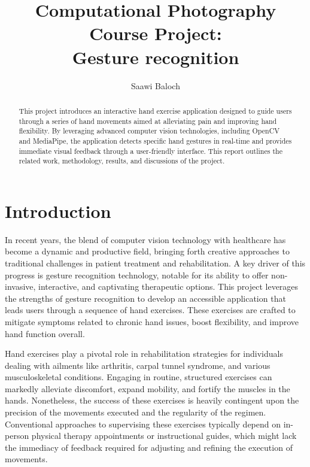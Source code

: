 \documentclass[12pt, letterpaper, twoside]{article}
\title{\textbf{Computational Photography Course Project:\\Gesture recognition}} %
\author{Saawi Baloch} %
\affiliation{Ontario Tech University} %
\begin{document}
\maketitle

\begin{abstract}
    \noindent
    
    This project introduces an interactive hand exercise application designed to guide users through a series of hand movements aimed at alleviating pain and improving hand flexibility. By leveraging advanced computer vision technologies, including OpenCV and MediaPipe, the application detects specific hand gestures in real-time and provides immediate visual feedback through a user-friendly interface. This report outlines the related work, methodology, results, and discussions of the project.

\end{abstract}

\vspace{2.5cm}

\thispagestyle{firstpage}

\pagebreak


\newgeometry{} %

\section{Introduction}
\label{sec:intro}
    In recent years, the blend of computer vision technology with healthcare has become a dynamic and productive field, bringing forth creative approaches to traditional challenges in patient treatment and rehabilitation. A key driver of this progress is gesture recognition technology, notable for its ability to offer non-invasive, interactive, and captivating therapeutic options. This project leverages the strengths of gesture recognition to develop an accessible application that leads users through a sequence of hand exercises. These exercises are crafted to mitigate symptoms related to chronic hand issues, boost flexibility, and improve hand function overall.

    Hand exercises play a pivotal role in rehabilitation strategies for individuals dealing with ailments like arthritis, carpal tunnel syndrome, and various musculoskeletal conditions. Engaging in routine, structured exercises can markedly alleviate discomfort, expand mobility, and fortify the muscles in the hands. Nonetheless, the success of these exercises is heavily contingent upon the precision of the movements executed and the regularity of the regimen. Conventional approaches to supervising these exercises typically depend on in-person physical therapy appointments or instructional guides, which might lack the immediacy of feedback required for adjusting and refining the execution of movements.
    
\end{document}
